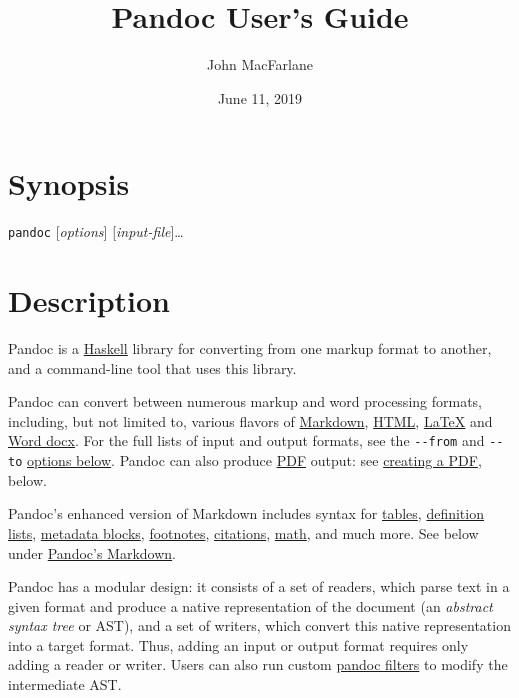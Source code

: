 \documentclass[
  12pt,
  a4paper,
]{article}
\title{Pandoc User's Guide}
\author{John MacFarlane}
\date{June 11, 2019}
\begin{document}
\maketitle

\hypertarget{synopsis}{%
\section{Synopsis}\label{synopsis}}

\texttt{pandoc} {[}\emph{options}{]} {[}\emph{input-file}{]}\ldots{}

\hypertarget{description}{%
\section{Description}\label{description}}

Pandoc is a \href{https://www.haskell.org}{Haskell} library for converting from one markup format
to another, and a command-line tool that uses this library.

Pandoc can convert between numerous markup and word processing formats, including, but not limited
to, various flavors of \href{http://daringfireball.net/projects/markdown/}{Markdown},
\href{http://www.w3.org/html/}{HTML}, \href{http://latex-project.org}{LaTeX} and
\href{https://en.wikipedia.org/wiki/Office_Open_XML}{Word docx}. For the full lists of input and
output formats, see the \texttt{-\/-from} and \texttt{-\/-to}
\protect\hyperlink{general-options}{options below}. Pandoc can also produce
\href{https://www.adobe.com/pdf/}{PDF} output: see \protect\hyperlink{creating-a-pdf}{creating a
PDF}, below.

Pandoc's enhanced version of Markdown includes syntax for \protect\hyperlink{tables}{tables},
\protect\hyperlink{definition-lists}{definition lists},
\protect\hyperlink{metadata-blocks}{metadata blocks}, \protect\hyperlink{footnotes}{footnotes},
\protect\hyperlink{citations}{citations}, \protect\hyperlink{math}{math}, and much more. See below
under \protect\hyperlink{pandocs-markdown}{Pandoc's Markdown}.

Pandoc has a modular design: it consists of a set of readers, which parse text in a given format
and produce a native representation of the document (an \emph{abstract syntax tree} or AST), and a
set of writers, which convert this native representation into a target format. Thus, adding an
input or output format requires only adding a reader or writer. Users can also run custom
\href{http://pandoc.org/filters.html}{pandoc filters} to modify the intermediate AST.
\end{document}
